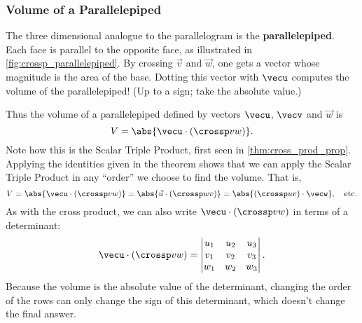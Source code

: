 \subsubsection{Volume of a Parallelepiped}


The three dimensional analogue to the parallelogram is the \textbf{parallelepiped}.
Each face is parallel to the opposite face, as illustrated in \autoref{fig:crossp_parallelepiped}. By crossing $\vec v$ and $\vec w$, one gets a vector whose magnitude is the area of the base. Dotting this vector with $\vecu$ computes the volume of the parallelepiped! (Up to a sign; take the absolute value.)

%
%
%
%

Thus the volume of a parallelepiped defined by vectors $\vecu$, $\vecv$ and $\vec w$ is
\begin{equation}
V = \abs{\vecu\cdot (\crossp vw)}.\label{eq:crossp2}
\end{equation}
Note how this is the Scalar Triple Product, first seen in \autoref{thm:cross_prod_prop}. Applying the identities given in the theorem shows that we can apply the Scalar Triple Product in any ``order'' we choose to find the volume. That is,
\[V = \abs{\vecu\cdot(\crossp vw)} = \abs{\vec u\cdot (\crossp wv)} = \abs{(\crossp uv)\cdot \vecw},\quad \text{etc.}\]
As with the cross product, we can also write $\vecu\cdot(\crossp vw)$ in terms of a determinant:
\[
 \vecu\cdot(\crossp vw)=
 \begin{vmatrix}u_1&u_2&u_3\\v_1&v_2&v_3\\w_1&w_2&w_3\end{vmatrix}.
\]
Because
%
%
the volume is the absolute value of the determinant, changing the order of the rows can only change the sign of this determinant, which doesn't change the final answer.

